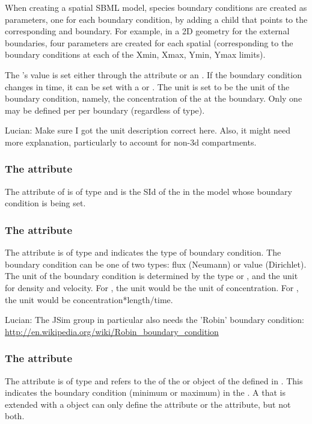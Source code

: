 When creating a spatial SBML model, species boundary conditions are created as parameters, one for each boundary condition, by adding a child \BoundaryCondition that points to the corresponding \Species and boundary. For example, in a 2D geometry for the external boundaries, four parameters are created for each spatial \Species (corresponding to the boundary conditions at each of the Xmin, Xmax, Ymin, Ymax limits). 

The \Parameter's value is set either through the  attribute or an \InitialAssignment.  If the boundary condition changes in time, it can be set with a \Rule or \Event.  The \Parameter unit is set to be the unit of the boundary condition, namely, the concentration of the \Species at the boundary.  Only one \BoundaryCondition may be defined per \Species per boundary (regardless of type).

{\color{red} Lucian: \notice Make sure I got the unit description correct here.  Also, it might need more explanation, particularly to account for non-3d compartments.}

\subsubsection{The  attribute}
The  attribute of \BoundaryCondition is of type  and is the SId of the \Species in the model whose boundary condition is being set.

\subsubsection{The  attribute}
The  attribute is of type  and indicates the type of boundary condition. The boundary condition can be one of two types: flux (Neumann) or value (Dirichlet).  The unit of the boundary condition is determined by the type  or , and the unit for density and velocity.  For , the unit would be the unit of concentration.  For , the unit would be concentration*length/time.

{\color{red} Lucian: \notice The JSim group in particular also needs the 'Robin' boundary condition:  \url{http://en.wikipedia.org/wiki/Robin_boundary_condition}}

\subsubsection{The  attribute}
The  attribute is of type  and refers to the  of the  or  object of the \CoordinateComponent defined in \Geometry. This  indicates the boundary condition (minimum or maximum) in the \CoordinateComponent. A \Parameter that is extended with a \BoundaryCondition object can only define the  attribute or the  attribute, but not both.

